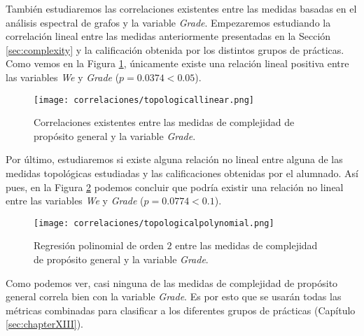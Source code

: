 También estudiaremos las correlaciones existentes entre las medidas basadas en el análisis espectral de grafos y la variable \emph{Grade}. Empezaremos estudiando la correlación lineal entre las medidas anteriormente presentadas en la Sección \ref{sec:complexity} y la calificación obtenida por los distintos grupos de prácticas. Como vemos en la Figura \ref{fig:correlations3}, únicamente existe una relación lineal positiva entre las variables \emph{We} y \emph{Grade} ($p = 0.0374 < 0.05$).

\begin{figure}[H]
    \centering
    \texttt{[image: correlaciones/topologicallinear.png]}
    \caption{Correlaciones existentes entre las medidas de complejidad de propósito general y la variable \emph{Grade}.}
    \label{fig:correlations3}
\end{figure}

Por último, estudiaremos si existe alguna relación no lineal entre alguna de las medidas topológicas estudiadas y las calificaciones obtenidas por el alumnado. Así pues, en la Figura \ref{fig:correlations4} podemos concluir que podría existir una relación no lineal entre las variables \emph{We} y \emph{Grade} ($p = 0.0774 < 0.1$).

\begin{figure}[H]
    \centering
    \texttt{[image: correlaciones/topologicalpolynomial.png]}
    \caption{Regresión polinomial de orden $2$ entre las medidas de complejidad de propósito general y la variable \emph{Grade}.}
    \label{fig:correlations4}
\end{figure}

Como podemos ver, casi ninguna de las medidas de complejidad de propósito general correla bien con la variable \emph{Grade}. Es por esto que se usarán todas las métricas combinadas para clasificar a los diferentes grupos de prácticas (Capítulo \ref{sec:chapterXIII}).